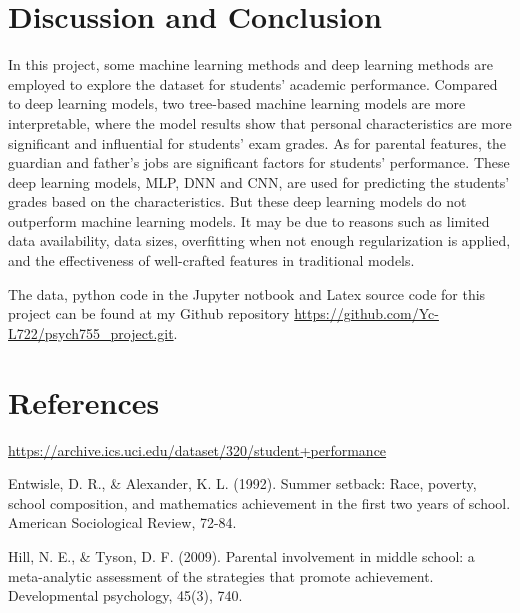 \documentclass[sn-mathphys-num]{sn-jnl}%
\theoremstyle{thmstyleone}%
\theoremstyle{thmstyletwo}%
\theoremstyle{thmstylethree}%
\begin{document}
\section{Discussion and Conclusion}

In this project, some machine learning methods and deep learning methods are employed to explore the dataset for students' academic performance. Compared to deep learning models, two tree-based machine learning models are more interpretable, where the model results show that personal characteristics are more significant and influential for students' exam grades. As for parental features, the guardian and father's jobs are significant factors for students' performance.  These deep learning models, MLP, DNN and CNN, are used for predicting the students' grades based on the characteristics. But these deep learning models do not outperform machine learning models. It may be due to reasons such as limited data availability, data sizes, overfitting when not enough regularization is applied, and the effectiveness of well-crafted features in traditional models. 


\clearpage
\backmatter


The data, python code in the Jupyter notbook and Latex source code for this project can be found at my Github repository \url{https://github.com/Yc-L722/psych755_project.git}.





\section*{References}

\noindent \url{https://archive.ics.uci.edu/dataset/320/student+performance}

\vspace{1em}


\vspace{1em}

\noindent Entwisle, D. R., & Alexander, K. L. (1992). Summer setback: Race, poverty, school composition, and mathematics achievement in the first two years of school. American Sociological Review, 72-84.


\noindent Hill, N. E., & Tyson, D. F. (2009). Parental involvement in middle school: a meta-analytic assessment of the strategies that promote achievement. Developmental psychology, 45(3), 740.
\end{document}
